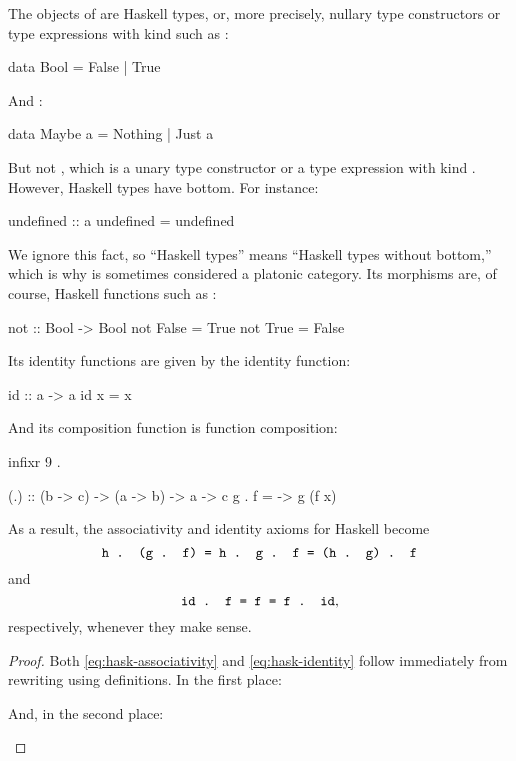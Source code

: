 The objects of \hask are Haskell types, or, more precisely, nullary
type constructors or type expressions with kind \texthaskell{*} such
as :
\begin{codehaskell}
data Bool = False | True
\end{codehaskell}
And :
\begin{codehaskell}
data Maybe a = Nothing | Just a
\end{codehaskell}
But not , which is a unary type constructor or a
type expression with kind \texthaskell{* -> *}. However, Haskell types
have bottom. For instance:
\begin{codehaskell}
undefined :: a
undefined = undefined
\end{codehaskell}
We ignore this fact, so ``Haskell types'' means ``Haskell types
without bottom,'' which is why \hask is sometimes considered a
platonic category. Its morphisms are, of course, Haskell functions
such as :
\begin{codehaskell}
not :: Bool -> Bool
not False = True
not True  = False
\end{codehaskell}
Its identity functions are given by the identity function:
\begin{codehaskell}
id :: a -> a
id x = x
\end{codehaskell}
And its composition function is function composition:
\begin{codehaskell}
infixr 9 .

(.) :: (b -> c) -> (a -> b) -> a -> c
g . f = \x -> g (f x)
\end{codehaskell}
As a result, the associativity and identity axioms for Haskell become
\begin{equation}
  \label{eq:hask-associativity}
  \text{\texttt{h . (g . f) = h . g . f = (h . g) . f}}
\end{equation}
and
\begin{equation}
  \label{eq:hask-identity}
  \text{\texttt{id . f = f = f . id}}
  \text{,}
\end{equation}
respectively, whenever they make sense.

\begin{proof}

  Both \eqref{eq:hask-associativity} and \eqref{eq:hask-identity}
  follow immediately from rewriting using definitions. In the first
  place:
  \begin{steps}
  \end{steps}
  And, in the second place:
  \begin{steps}
  \end{steps}

\end{proof}

